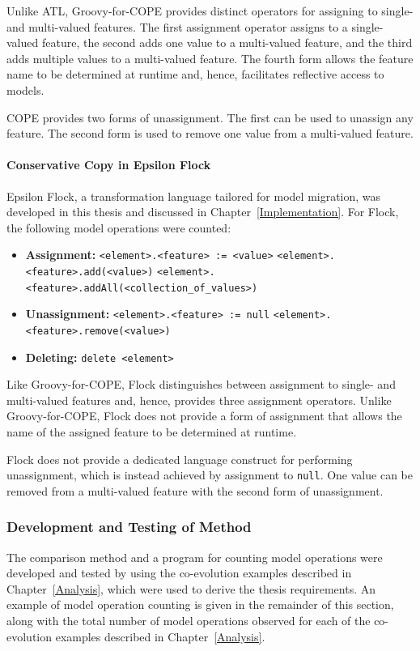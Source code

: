 Unlike ATL, Groovy-for-COPE provides distinct operators for assigning to single- and multi-valued features. The first assignment operator assigns to a single-valued feature, the second adds one value to a multi-valued feature, and the third adds multiple values to a multi-valued feature. The fourth form allows the feature name to be determined at runtime and, hence, facilitates reflective access to models. 

COPE provides two forms of unassignment. The first can be used to unassign any feature. The second form is used to remove one value from a multi-valued feature.


\paragraph{Conservative Copy in Epsilon Flock}
Epsilon Flock, a transformation language tailored for model migration, was developed in this thesis and discussed in Chapter~\ref{Implementation}. For Flock, the following model operations were counted:

\begin{itemize}
	\item \textbf{Assignment:}
	\subitem \texttt{<element>.<feature> := <value>} 
	\subitem \texttt{<element>.<feature>.add(<value>)}
	\subitem \texttt{<element>.<feature>.addAll(<collection\_of\_values>)}
	
	\item \textbf{Unassignment:}
	\subitem \texttt{<element>.<feature> := null}
	\subitem \texttt{<element>.<feature>.remove(<value>)}
	
	\item \textbf{Deleting:}
	\subitem \texttt{delete <element>}
\end{itemize}

Like Groovy-for-COPE, Flock distinguishes between assignment to single- and multi-valued features and, hence, provides three assignment operators. Unlike Groovy-for-COPE, Flock does not provide a form of assignment that allows the name of the assigned feature to be determined at runtime.

Flock does not provide a dedicated language construct for performing unassignment, which is instead achieved by assignment to \texttt{null}. One value can be removed from a multi-valued feature with the second form of unassignment.


\subsubsection{Development and Testing of Method}
\label{subsubsec:quantitive_method_development}
The comparison method and a program for counting model operations were developed and tested by using the co-evolution examples described in Chapter~\ref{Analysis}, which were used to derive the thesis requirements. An example of model operation counting is given in the remainder of this section, along with the total number of model operations observed for each of the co-evolution examples described in Chapter~\ref{Analysis}.

